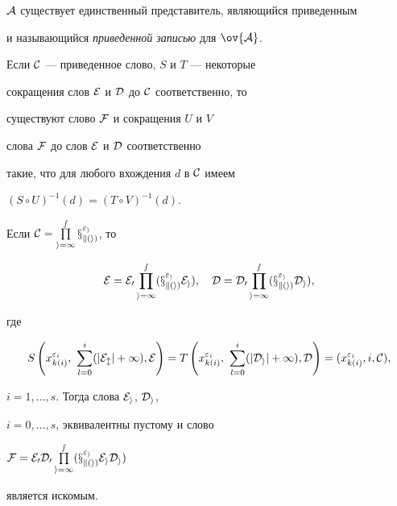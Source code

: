 $\cal A$ существует единственный представитель, являющийся приведенным 


и называющийся {\it приведенной записью} для $\ov{\cal A}$.





\begin{lemnonum}


Если $\cal C$ --- приведенное слово, $S$ и $T$ --- некоторые 


сокращения слов $\cal E$ и $\cal D$ до $\cal C$ соответственно, то


существуют слово $\cal F$ и сокращения $U$ и $V$


слова $\cal F$ до слов $\cal E$ и $\cal D$ соответственно 


такие, что для любого вхождения $d$ в $\cal C$ имеем


$(S\circ U)^{-1}(d)=(T\circ V)^{-1}(d)$.


\end{lemnonum}





\begin{pf}


Если $\cal C=\prod\limits_{i=1}^s x^{\varepsilon_i}_{k(i)}$, то


$$


\cal E=\cal E_0\prod_{i=1}^s (x^{\varepsilon_i}_{k(i)}\cal E_i),\quad


\cal D=\cal D_0\prod_{i=1}^s (x^{\varepsilon_i}_{k(i)} \cal D_i),


$$


где


$$


S\left(x^{\varepsilon_i}_{k(i)},\ \sum^i_{l=0}


(|\cal E_l|+1),\cal E\right)=


T\left(x^{\varepsilon_i}_{k(i)},\ \sum^i_{l=0}(|\cal D_i|+1),\cal D\right)=


(x^{\varepsilon_i}_{k(i)},i,\cal C),


$$


$i=1,\dotsc,s$. Тогда слова $\cal E_i$, $\cal D_i$,


$i=0,\dotsc,s$, эквивалентны пустому и слово


$\cal F=\cal E_0\cal D_0\PL_{i=1}^s


(x^{\varepsilon_i}_{k(i)}\cal E_i\cal D_i)$


является искомым. 


\end{pf}





